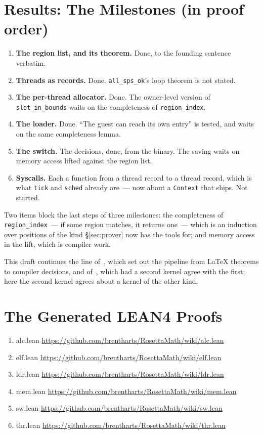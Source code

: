 \documentclass[11pt]{article}
\begin{document}
\section{Results: The Milestones (in proof order)}

\begin{enumerate}
\item \textbf{The region list, and its theorem.}  Done, to the founding
  sentence verbatim.
\item \textbf{Threads as records.}  Done.  \texttt{all\_sps\_ok}'s loop
  theorem is not stated.
\item \textbf{The per-thread allocator.}  Done.  The owner-level version of
  \texttt{slot\_in\_bounds} waits on the completeness of
  \texttt{region\_index}.
\item \textbf{The loader.}  Done.  ``The guest can reach its own entry'' is
  tested, and waits on the same completeness lemma.
\item \textbf{The switch.}  The decisions, done, from the binary.  The
  saving waits on memory access lifted against the region list.
\item \textbf{Syscalls.}  Each a function from a thread record to a
  thread record, which is what \texttt{tick} and \texttt{sched} already
  are~--- now about a \texttt{Context} that ships.  Not started.
\end{enumerate}

Two items block the last steps of three milestones: the completeness of
\texttt{region\_index}~--- if some region matches, it returns one~--- which
is an induction over positions of the kind \S\ref{sec:prover} now has the
tools for; and memory access in the lift, which is compiler work.

This draft continues the line of~\cite{hartshorn2026a}, which set out the
pipeline from \LaTeX{} theorems to compiler decisions, and
of~\cite{hartshorn2026b}, which had a second kernel agree with the first;
here the second kernel agrees about a kernel of the other kind.

\appendix
\section{The Generated LEAN4 Proofs}

\begin{enumerate}
\item alc.lean \url{https://github.com/brentharts/RosettaMath/wiki/alc.lean}
\item elf.lean \url{https://github.com/brentharts/RosettaMath/wiki/elf.lean}
\item ldr.lean \url{https://github.com/brentharts/RosettaMath/wiki/ldr.lean}
\item mem.lean \url{https://github.com/brentharts/RosettaMath/wiki/mem.lean}
\item sw.lean \url{https://github.com/brentharts/RosettaMath/wiki/sw.lean}
\item thr.lean \url{https://github.com/brentharts/RosettaMath/wiki/thr.lean}
\end{enumerate}
\end{document}
